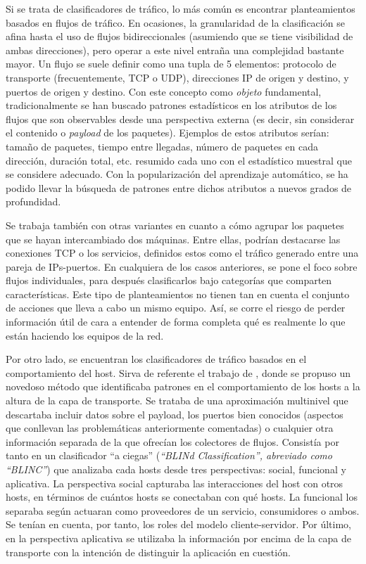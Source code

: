 Si se trata de clasificadores de tráfico, lo más común es encontrar planteamientos basados en flujos de tráfico.
En ocasiones, la granularidad de la clasificación se afina hasta el uso de flujos bidireccionales (asumiendo que se tiene visibilidad de ambas direcciones), pero operar a este nivel entraña una complejidad bastante mayor.
Un flujo se suele definir como una tupla de 5 elementos: protocolo de transporte (frecuentemente, TCP o UDP), direcciones IP de origen y destino, y puertos de origen y destino.
Con este concepto como \emph{objeto} fundamental, tradicionalmente se han buscado patrones estadísticos en los atributos de los flujos que son observables desde una perspectiva externa (es decir, sin considerar el contenido o \emph{payload} de los paquetes).
Ejemplos de estos atributos serían: tamaño de paquetes, tiempo entre llegadas, número de paquetes en cada dirección, duración total, etc. resumido cada uno con el estadístico muestral que se considere adecuado.
Con la popularización del aprendizaje automático, se ha podido llevar la búsqueda de patrones entre dichos atributos a nuevos grados de profundidad.

Se trabaja también con otras variantes en cuanto a cómo agrupar los paquetes que se hayan intercambiado dos máquinas.
Entre ellas, podrían destacarse las conexiones TCP o los servicios, definidos estos como el tráfico generado entre una pareja de IPs-puertos.
En cualquiera de los casos anteriores, se pone el foco sobre flujos individuales, para después clasificarlos bajo categorías que comparten características.
Este tipo de planteamientos no tienen tan en cuenta el conjunto de acciones que lleva a cabo un mismo equipo.
Así, se corre el riesgo de perder información útil de cara a entender de forma completa qué es realmente lo que están haciendo los equipos de la red.

Por otro lado, se encuentran los clasificadores de tráfico basados en el comportamiento del host.
Sirva de referente el trabajo de \cite{KPF05}, donde se propuso un novedoso método que identificaba patrones en el comportamiento de los hosts a la altura de la capa de transporte.
Se trataba de una aproximación multinivel que descartaba incluir datos sobre el payload, los puertos bien conocidos (aspectos que conllevan las problemáticas anteriormente comentadas) o cualquier otra información separada de la que ofrecían los colectores de flujos.
Consistía por tanto en un clasificador ``a ciegas'' (\emph{``BLINd Classification'', abreviado como ``BLINC''}) que analizaba cada hosts desde tres perspectivas: social, funcional y aplicativa.
La perspectiva social capturaba las interacciones del host con otros hosts, en términos de cuántos hosts se conectaban con qué hosts.
La funcional los separaba según actuaran como proveedores de un servicio, consumidores o ambos.
Se tenían en cuenta, por tanto, los roles del modelo cliente-servidor.
Por último, en la perspectiva aplicativa se utilizaba la información por encima de la capa de transporte con la intención de distinguir la aplicación en cuestión.

